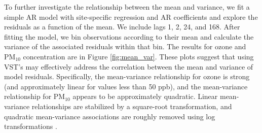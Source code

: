 \documentclass[alpha-refs]{wiley-article}
\begin{document}
To further investigate the relationship between the mean and variance, we fit a simple AR model with site-specific regression and AR coefficients and explore the residuals as a function of the mean. We include lags 1, 2, 24, and 168. After fitting the model, we bin observations according to their mean and calculate the variance of the associated residuals within that bin. The results for ozone and $\text{PM}_{10}$ concentration are in Figure \ref{fig:mean_var}. These plots suggest that using VST's may effectively address the correlation between the mean and variance of model residuals. Specifically, the mean-variance relationship for ozone is strong (and approximately linear for values less than 50 ppb), and the mean-variance relationship for $\text{PM}_{10}$ appears to be approximately quadratic. Linear mean-variance relationships are stabilized by a square-root transformation, and quadratic mean-variance associations are roughly removed using log transformations \citep[see, for example, Section 3.3. in][]{hocking2013}.
\vspace{-3mm}
\end{document}
